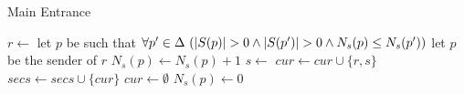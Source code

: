 \begin{algorithm}
\caption{Main Entrance}\label{algo:main}
\begin{algorithmic}[1]
\State $r \gets$ 
\State let $p$ be such that $\forall p^\prime \in \Delta\ (|S(p)|>0  \wedge |S(p^\prime)|>0  \wedge \Call{$N_s$}{p}\le \Call{$N_s$}{p^\prime} )$
\Else 
\State let $p$ be the sender of $r$
\EndIf
\State $N_s(p)\gets N_s(p)+1$
\State $s\gets$ 
\State $\mathit{cur}\gets \mathit{cur}\cup \{r,s\}$
\State $\mathit{secs}\gets\mathit{secs}\cup\{\mathit{cur}\}$
\State $\mathit{cur}\gets\emptyset$
\State $N_s(p)\gets 0$
\EndFor
\EndIf
\EndWhile
\end{algorithmic}
\end{algorithm}



